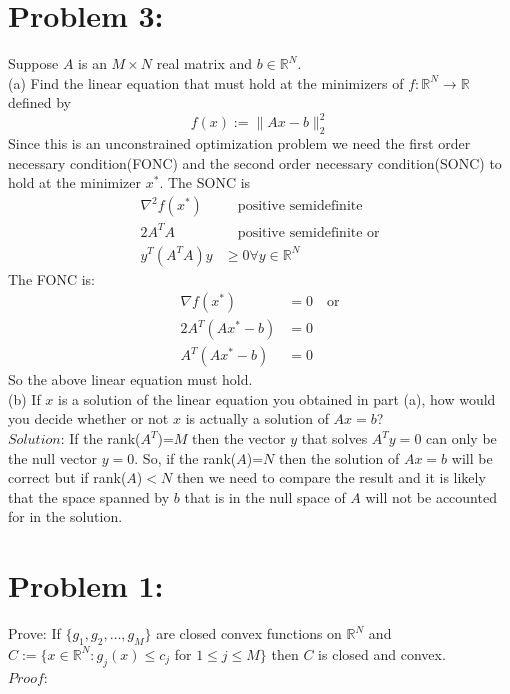 \documentclass[12pt]{report}
\begin{document}
\section*{Problem 3:}
Suppose $A$ is an $M \times N$ real matrix and $b\in\mathbb{R}^N $. \\
(a) Find the linear equation that must hold at the minimizers of
$f : \mathbb{R}^N \rightarrow \mathbb{R}$ defined by $$ f (x) := \| Ax-b \|_2^2 $$
Since this is an unconstrained optimization problem we need the first order necessary
condition(FONC) and the second order necessary condition(SONC) to hold at the minimizer $x^*$. The
SONC is
\begin{align*}
\nabla^2 f(x^*) & \quad \text{positive semidefinite} \\
2A^TA & \quad \text{positive semidefinite or} \\
y^T(A^TA)y & \geq 0 \forall y \in \mathbb{R}^N
\end{align*}
The FONC is:
\begin{align*}
\nabla f(x^*) &= 0 \quad \text{or} \\
2A^T(Ax^*-b) &= 0 \\
A^T(Ax^*-b) &= 0
\end{align*}
So the above linear equation must hold.\\
(b) If $x$ is a solution of the linear equation you obtained in part (a), how would you decide
whether or not $x$ is actually a solution of $Ax = b$?\\
$Solution$: If the rank($A^T$)=$M$ then the vector $y$ that solves $A^Ty=0$ can only be the null
vector $y=0$. So, if the rank($A$)=$N$ then the solution of $Ax=b$ will be correct but if
rank($A$)$<N$ then we need to compare the result and it is likely that the space spanned by $b$
that is in the null space of $A$ will not be accounted for in the solution.

\pagebreak

\section*{Problem 1:}
Prove: If $\{g_1,g_2,\dots,g_M\}$ are closed convex functions on $\mathbb{R}^N$ and \\
$C:=\{x\in\mathbb{R}^N:g_j(x)\leq c_j$ for $1\leq j \leq M \}$ then $C$ is closed and
convex.\\
$Proof$: 
\end{document}
